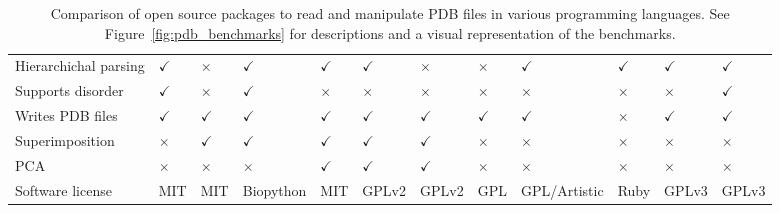 \begin{table}
\begin{footnotesize}
\begin{tabular}{ l p{1.2cm} p{1.2cm} p{1.5cm} p{1.2cm} p{1.7cm} p{1.2cm} p{1.2cm} p{1.2cm} p{1.2cm} p{1.2cm} p{1.2cm} }
Hierarchichal parsing & $\checkmark$      & $\times$       & $\checkmark$       & $\checkmark$   & $\checkmark$        & $\times$       & $\times$      & $\checkmark$          & $\checkmark$     & $\checkmark$    & $\checkmark$   \\
Supports disorder     & $\checkmark$      & $\times$       & $\checkmark$       & $\times$       & $\times$            & $\times$       & $\times$      & $\times$              & $\times$         & $\times$        & $\checkmark$   \\
Writes PDB files      & $\checkmark$      & $\checkmark$   & $\checkmark$       & $\checkmark$   & $\checkmark$        & $\checkmark$   & $\checkmark$  & $\checkmark$          & $\times$         & $\checkmark$    & $\checkmark$   \\
Superimposition       & $\times$          & $\checkmark$   & $\checkmark$       & $\checkmark$   & $\checkmark$        & $\checkmark$   & $\times$      & $\times$              & $\times$         & $\times$        & $\times$       \\
PCA                   & $\times$          & $\times$       & $\times$           & $\checkmark$   & $\checkmark$        & $\checkmark$   & $\times$      & $\times$              & $\times$         & $\times$        & $\times$       \\
Software license      & MIT               & MIT            & Biopython          & MIT            & GPLv2               & GPLv2          & GPL           & GPL/\newline Artistic & Ruby             & GPLv3           & GPLv3          \\
\hline
\end{tabular}
\end{footnotesize}

\caption[Comparison of open source packages to read and manipulate PDB files in various programming languages]
{Comparison of open source packages to read and manipulate PDB files in various programming languages.
See Figure~\ref{fig:pdb_benchmarks} for descriptions and a visual representation of the benchmarks.}

\label{tab:package_comparison}
\end{table}


